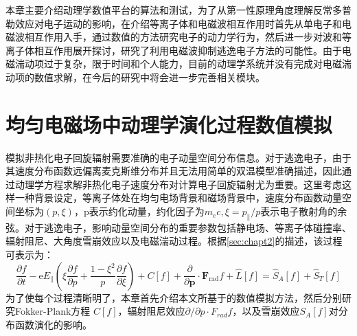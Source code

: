 本章主要介绍动理学数值平台的算法和测试，为了从第一性原理角度理解反常多普勒效应对电子运动的影响，在介绍等离子体和电磁波相互作用时首先从单电子和电磁波相互作用入手，通过数值的方法研究电子的动力学行为，然后进一步对波和等离子体相互作用展开探讨，研究了利用电磁波抑制逃逸电子方法的可能性。由于电磁湍动项过于复杂，限于时间和个人能力，目前的动理学系统并没有完成对电磁湍动项的数值求解，在今后的研究中将会进一步完善相关模块。
\section{均匀电磁场中动理学演化过程数值模拟}
模拟非热化电子回旋辐射需要准确的电子动量空间分布信息。对于逃逸电子，由于其速度分布函数远偏离麦克斯维分布并且无法用简单的双温模型准确描述，因此通过动理学方程求解非热化电子速度分布对计算电子回旋辐射尤为重要。这里考虑这样一种背景设定，等离子体处在均匀电场背景和磁场背景中，速度分布函数动量空间坐标为$(p,ξ)$，p表示约化动量，约化因子为$m_e c,ξ=p_∥/p$表示电子散射角的余弦。对于逃逸电子，影响动量空间分布的重要参数包括静电场、等离子体碰撞率、辐射阻尼、大角度雪崩效应以及电磁湍动过程。根据\autoref{sec:chapt2}的描述，该过程可表示为：
\begin{equation}
\frac{\partial f}{\partial t}-\mathrm{e} E_{\|}\left(\xi \frac{\partial f}{\partial p}+\frac{1-\xi^{2}}{p} \frac{\partial f}{\partial \xi}\right)+C[f]+\frac{\partial}{\partial \boldsymbol{p}} \cdot \boldsymbol{F}_{\mathrm{rad}} f+\widehat{L}[f]=\hat{S}_{A}[f]+\hat{S}_T[f]
\end{equation}
为了使每个过程清晰明了，本章首先介绍本文所基于的数值模拟方法，然后分别研究Fokker-Plank方程 $C[f]$，辐射阻尼效应$∂/∂p⋅F_{rad} f$，以及雪崩效应$S_A [f]$对分布函数演化的影响。
